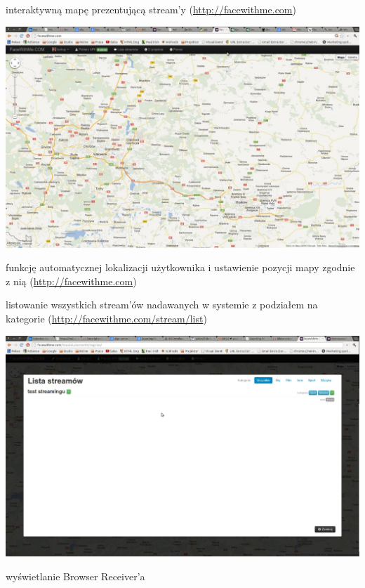 \begin{packed_item}
{\begin{center}
        \end{center}
    }
    \item{interaktywną mapę prezentującą stream'y (\url{http://facewithme.com})
        \begin{center}
            \includegraphics[width=\textwidth]{img/screens/interfejs_www/interaktywna-mapa.jpg}
        \end{center}
    }
    \item{funkcję automatycznej lokalizacji użytkownika i ustawienie pozycji mapy zgodnie z nią (\url{http://facewithme.com})}
    \item{listowanie wszystkich stream'ów nadawanych w systemie z podziałem na kategorie  (\url{http://facewithme.com/stream/list})
        \begin{center}
            \includegraphics[width=\textwidth]{img/screens/interfejs_www/lista-streamow.jpg}
        \end{center}
    }
    \item{wyświetlanie Browser Receiver'a
}
\end{packed_item}
